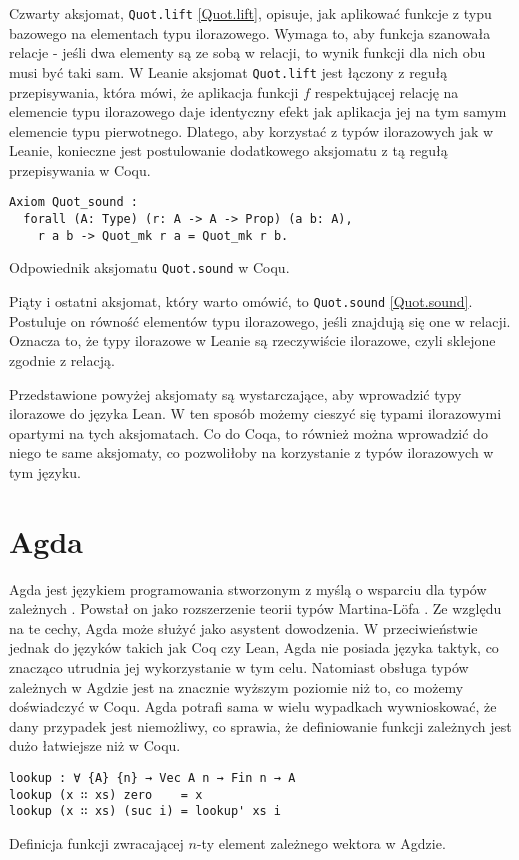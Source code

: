 Czwarty aksjomat, \texttt{Quot.lift} \ref{Quot.lift}, opisuje, jak aplikować funkcje z typu bazowego na elementach typu ilorazowego. Wymaga to, aby funkcja szanowała relacje - jeśli dwa elementy są ze sobą w relacji, to wynik funkcji dla nich obu musi być taki sam. W Leanie aksjomat \texttt{Quot.lift} jest łączony z regułą przepisywania, która mówi, że aplikacja funkcji $f$ respektującej relację na elemencie typu ilorazowego daje identyczny efekt jak aplikacja jej na tym samym elemencie typu pierwotnego. Dlatego, aby korzystać z typów ilorazowych jak w Leanie, konieczne jest postulowanie dodatkowego aksjomatu z tą regułą przepisywania w Coqu.
\begin{code}
\begin{verbatim}
Axiom Quot_sound :
  forall (A: Type) (r: A -> A -> Prop) (a b: A),
    r a b -> Quot_mk r a = Quot_mk r b.
\end{verbatim}
\caption{Odpowiednik aksjomatu \texttt{Quot.sound} w Coqu.}
\label{Quot.sound}
\end{code}

Piąty i ostatni aksjomat, który warto omówić, to \texttt{Quot.sound} \ref{Quot.sound}. Postuluje on równość elementów typu ilorazowego, jeśli znajdują się one w relacji. Oznacza to, że typy ilorazowe w Leanie są rzeczywiście ilorazowe, czyli sklejone zgodnie z relacją.

Przedstawione powyżej aksjomaty są wystarczające, aby wprowadzić typy ilorazowe do języka Lean. W ten sposób możemy cieszyć się typami ilorazowymi opartymi na tych aksjomatach. Co do Coqa, to również można wprowadzić do niego te same aksjomaty, co pozwoliłoby na korzystanie z typów ilorazowych w tym języku.
\section{Agda}
Agda jest językiem programowania stworzonym z myślą o wsparciu dla typów zależnych \cite{agda}. Powstał on jako rozszerzenie teorii typów Martina-Löfa \cite{MARTINLOF197573}. Ze względu na te cechy, Agda może służyć jako asystent dowodzenia. W przeciwieństwie jednak do języków takich jak Coq czy Lean, Agda nie posiada języka taktyk, co znacząco utrudnia jej wykorzystanie w tym celu. Natomiast obsługa typów zależnych w Agdzie jest na znacznie wyższym poziomie niż to, co możemy doświadczyć w Coqu. Agda potrafi sama w wielu wypadkach wywnioskować, że dany przypadek jest niemożliwy, co sprawia, że definiowanie funkcji zależnych jest dużo łatwiejsze niż w Coqu.
\begin{code}
\begin{verbatim}
lookup : ∀ {A} {n} → Vec A n → Fin n → A
lookup (x ∷ xs) zero    = x
lookup (x ∷ xs) (suc i) = lookup' xs i
\end{verbatim}
\caption{Definicja funkcji zwracającej $n$-ty element zależnego wektora w Agdzie.}
\label{agda-lookup}
\end{code}
